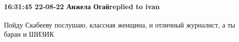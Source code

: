  
 
 
 
 

\paragraph{16:31:45 22-08-22 Анжела Огайreplied to ivan}

Пойду Скабееву послушаю, классная женщина, и отличный журналист, а ты баран и ШИЗИК🤣🤣🤣
